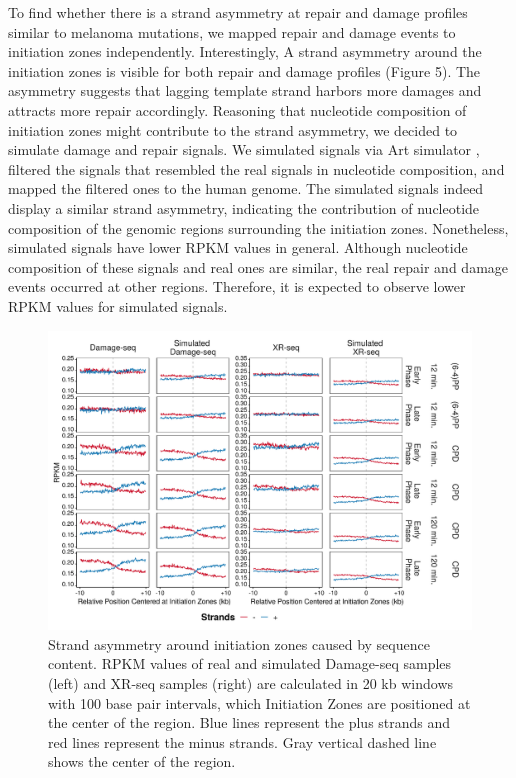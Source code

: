 To find whether there is a strand asymmetry at repair and damage profiles similar to melanoma mutations, we mapped repair and damage events to initiation zones independently. Interestingly, A strand asymmetry around the initiation zones is visible for both repair and damage profiles (Figure 5). The asymmetry suggests that lagging template strand harbors more damages and attracts more repair accordingly. Reasoning that nucleotide composition of initiation zones might contribute to the strand asymmetry, we decided to simulate damage and repair signals. We simulated signals via Art simulator \citep{huang2012art}, filtered the signals that resembled the real signals in nucleotide composition, and mapped the filtered ones to the human genome. The simulated signals indeed display a similar strand asymmetry, indicating the contribution of nucleotide composition of the genomic regions surrounding the initiation zones. Nonetheless, simulated signals have lower RPKM values in general. Although nucleotide composition of these signals and real ones are similar, the real repair and damage events occurred at other regions. Therefore, it is expected to observe lower RPKM values for simulated signals. 

\begin{figure}[H]
    \begin{center}
    \includegraphics[width=\textwidth]{Chapters/4_results/figures/fig5}
    \caption[Strand asymmetry around initiation zones caused by sequence content.]{Strand asymmetry around initiation zones caused by sequence content. RPKM values of real and simulated Damage-seq samples (left) and XR-seq samples (right) are calculated in 20 kb windows with 100 base pair intervals, which Initiation Zones are positioned at the center of the region. Blue lines represent the plus strands and red lines represent the minus strands. Gray vertical dashed line shows the center of the region.}
    \label{fig:simulation}
    \end{center}
    \end{figure}

